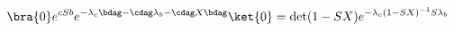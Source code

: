 \begin{equation} %
\label{eq:sqz2}
\bra{0} e^{c S b} 
e^{-\lambda_c \bdag - \cdag\lambda_b - \cdag X \bdag} \ket{0}
  = \det (1-SX) e^{-\lambda_c (1-SX)^{-1} S \lambda_b} 
\end{equation} 
